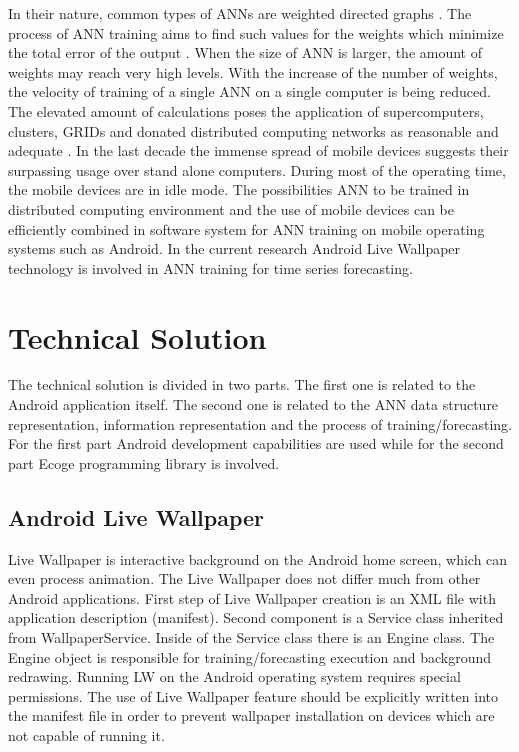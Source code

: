 ﻿\documentclass{llncs}
\begin{document}
In their nature, common types of ANNs are weighted directed graphs \cite{balabanov03}. The process of ANN training aims to find such values for the weights which minimize the total error of the output \cite{balabanov04}. When the size of ANN is larger, the amount of weights may reach very high levels. With the increase of the number of weights, the velocity of training of a single ANN on a single computer is being reduced. The elevated amount of calculations poses the application of supercomputers, clusters, GRIDs and donated distributed computing networks as reasonable and adequate \cite{balabanov01,balabanov02,keremedchiev01,tomov01}. In the last decade the immense spread of mobile devices suggests their surpassing usage over stand alone computers. During most of the operating time, the mobile devices are in idle mode. The possibilities ANN to be trained in distributed computing environment and the use of mobile devices can be efficiently combined in software system for ANN training on mobile operating systems such as Android. In the current research Android Live Wallpaper technology is involved in ANN training for time series forecasting.

\section{Technical Solution}

The technical solution is divided in two parts. The first one is related to the Android application itself. The second one is related to the ANN data structure representation, information representation and the process of training/forecasting. For the first part Android development capabilities are used while for the second part Ecoge programming library is involved. 

\subsection{Android Live Wallpaper}

Live Wallpaper is interactive background on the Android home screen, which can even process animation. The Live Wallpaper does not differ much from other Android applications. First step of Live Wallpaper creation is an XML file with application description (manifest). Second component is a Service class inherited from WallpaperService. Inside of the Service class there is an Engine class. The Engine object is responsible for training/forecasting execution and background redrawing. Running LW on the Android operating system requires special permissions. The use of Live Wallpaper feature should be explicitly written into the manifest file in order to prevent wallpaper installation on devices which are not capable of running it. 
\end{document}
